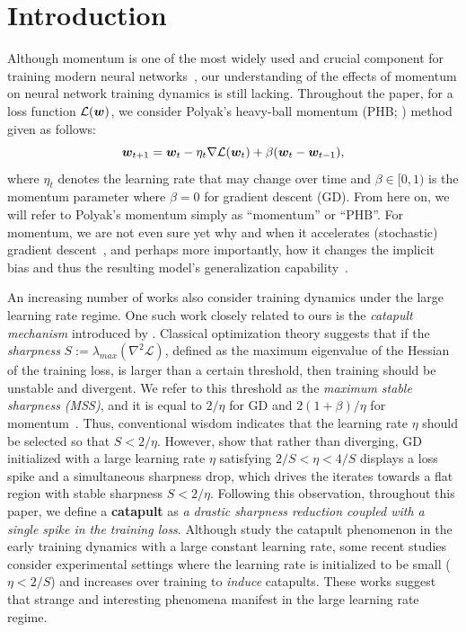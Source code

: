 \section{Introduction}
Although momentum is one of the most widely used and crucial component for training modern neural networks~\citep{sutskever2013momentum}, our understanding of the effects of momentum on neural network training dynamics is still lacking.
Throughout the paper, for a loss function $\mathcal{L}({\bm{w}})$, we consider Polyak's heavy-ball momentum (PHB; \citet{polyak1964momentum}) method given as follows:
\begin{equation}
\label{eqn:momentum}
    {\bm{w}}_{t+1} = {\bm{w}}_t - \eta_t \nabla \mathcal{L}({\bm{w}}_t) + \beta ({\bm{w}}_t - {\bm{w}}_{t-1}),
\end{equation}
where $\eta_t$ denotes the learning rate that may change over time and $\beta \in [0,1)$ is the momentum parameter where $\beta=0$ for gradient descent (GD). From here on, we will refer to Polyak's momentum simply as ``momentum'' or ``PHB''.
For momentum, we are not even sure yet why and when it accelerates (stochastic) gradient descent~\citep{fu2023momentum,ganesh2023momentum,kidambi2018momentum}, and perhaps more importantly, how it changes the implicit bias and thus the resulting model's generalization capability~\citep{wang2023momentum,wang2022implicit,ghosh2023implicit,jelassi2022momentum}.

An increasing number of works also consider training dynamics under the large learning rate regime. One such work closely related to ours is the \emph{catapult mechanism} introduced by \citet{lewkowycz2020catapult}. Classical optimization theory suggests that if the \emph{sharpness} $S := \lambda_{max}(\nabla^2 \mathcal{L})$, defined as the maximum eigenvalue of the Hessian of the training loss, is larger than a certain threshold, then training should be unstable and divergent. We refer to this threshold as the \emph{maximum stable sharpness (MSS)}, and it is equal to $2/\eta$ for GD and $2(1+\beta)/\eta$ for momentum~\citep{goh2017momentum}. Thus, conventional wisdom indicates that the learning rate $\eta$ should be selected so that $S < 2/\eta$. However, \citet{lewkowycz2020catapult} show that rather than diverging, GD initialized with a large learning rate $\eta$ satisfying $2/S < \eta  < 4/S$ displays a loss spike and a simultaneous sharpness drop, which drives the iterates towards a flat region with stable sharpness $S < 2/\eta$.
Following this observation, throughout this paper, we define a {\bf catapult} as \emph{a drastic sharpness reduction coupled with a single spike in the training loss}.
Although \citet{lewkowycz2020catapult} study the catapult phenomenon in the early training dynamics with a large constant learning rate, some recent studies~\cite{zhu2023catapult} consider experimental settings where the learning rate is initialized to be small ($\eta < 2/S$) and increases over training to \emph{induce} catapults. These works suggest that strange and interesting phenomena manifest in the large learning rate regime.

